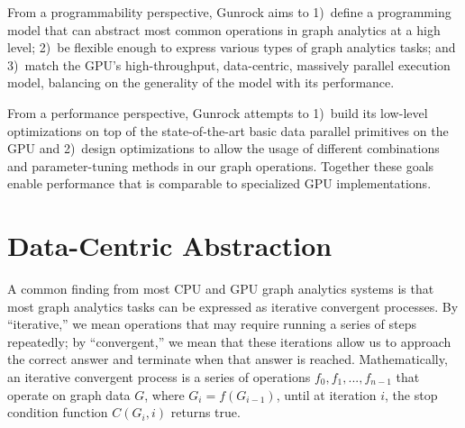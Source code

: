 \documentclass[format=acmsmall,review=false,screen=true]{acmart}
\begin{document}
\begin{table}
  \caption[GPU graph analytics system comparison table.]{Detailed
    comparison of different high-level GPU graph analytics systems.
    m-p means message-passing based model, v-c and e-c mean
    vertex-centric and edge-centric respectively. Note that part of
    load balancing work in Frog and CuSha are done offline during the
    coloring model and G-shard generation process respectively. This
    table focuses on graph-centric abstractions, so we leave out
    libraries that follow a linear algebra abstraction such as
    nvGRAPH\@.\label{tab:gpulib}}
\end{table}

From a programmability perspective, Gunrock aims to 1)~define a
programming model that can abstract most common operations in graph
analytics at a high level; 2)~be flexible enough to express various
types of graph analytics tasks; and 3)~match the GPU's
high-throughput, data-centric, massively parallel execution model,
balancing on the generality of the model with its performance.

From a performance perspective, Gunrock attempts to 1)~build its
low-level optimizations on top of the state-of-the-art basic data
parallel primitives on the GPU and 2)~design optimizations to allow
the usage of different combinations and parameter-tuning methods in
our graph operations. Together these goals enable performance
that is comparable to specialized GPU implementations.

\section{Data-Centric Abstraction}
\label{sec:abstraction}
A common finding from most CPU and GPU graph analytics systems is that
most graph analytics tasks can be expressed as iterative convergent
processes. By ``iterative,'' we mean operations that may require
running a series of steps repeatedly; by ``convergent,'' we mean that
these iterations allow us to approach the correct answer and terminate
when that answer is reached. Mathematically, an iterative convergent
process is a series of operations $f_0, f_1, ..., f_{n-1}$ that
operate on graph data $G$, where $G_i=f(G_{i-1})$, until at iteration
$i$, the stop condition function $C(G_i, i)$ returns true.
\end{document}
